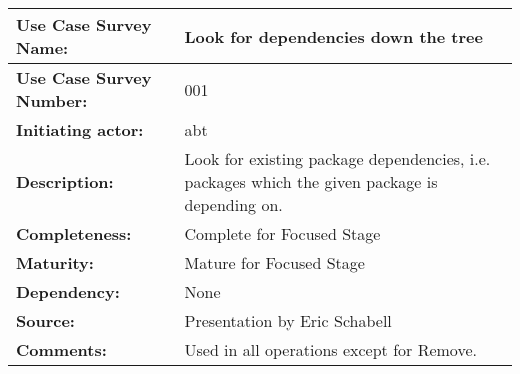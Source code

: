 \begin{tabularx}{\linewidth}{|l|X|}
\hline
\textbf{Use Case Survey Name:} & \textbf{Look for dependencies down the tree} \\
\hline
\textbf{Use Case Survey Number:} & 001 \\
\hline
\textbf{Initiating actor:} & abt \\
\hline
\textbf{Description:} & Look for existing package dependencies, i.e. packages which the given package is depending on.\\
\hline
\textbf{Completeness:} & Complete for Focused Stage \\
\hline
\textbf{Maturity:} & Mature for Focused Stage \\
\hline
\textbf{Dependency:} & None \\
\hline
\textbf{Source:} & Presentation by Eric Schabell \\
\hline
\textbf{Comments:} & Used in all operations except for Remove. \\
\hline
\end{tabularx}
